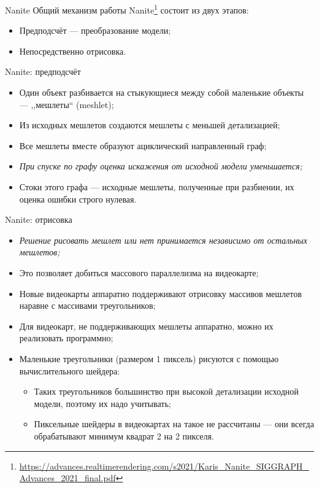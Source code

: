 \documentclass{beamer}
\begin{document}
    \begin{frame}{Nanite}
        Общий механизм работы
        Nanite\footnote{
            \url{https://advances.realtimerendering.com/s2021/Karis_Nanite_SIGGRAPH_Advances_2021_final.pdf}
        } состоит из двух этапов:
        \begin{itemize}
            \item Предподсчёт --- преобразование модели;
            \item Непосредственно отрисовка.
        \end{itemize}
    \end{frame}

    \begin{frame}{Nanite: предподсчёт}
        \begin{itemize}
            \item Один объект разбивается на
            стыкующиеся между собой маленькие объекты
            --- ,,мешлеты`` (meshlet);
            \item Из исходных мешлетов создаются
            мешлеты с меньшей детализацией;
            \item Все мешлеты вместе образуют ациклический
            направленный граф;
            \item \emph{При спуске по графу
            оценка искажения от исходной модели уменьшается;}
            \item Стоки этого графа --- исходные мешлеты,
            полученные при разбиении,
            их оценка ошибки строго нулевая.
        \end{itemize}
    \end{frame}

    \begin{frame}{Nanite: отрисовка}
        \begin{itemize}
            \item \emph{Решение рисовать мешлет или нет
            принимается независимо от остальных мешлетов;}
            \item Это позволяет добиться массового параллелизма
            на видеокарте;
            \item Новые видеокарты аппаратно поддерживают отрисовку
            массивов мешлетов наравне с массивами треугольников;
            \item Для видеокарт, не поддерживающих мешлеты аппаратно,
            можно их реализовать программно;
            \item Маленькие треугольники (размером 1 пиксель)
            рисуются с помощью вычислительного шейдера:
            \begin{itemize}
                \item Таких треугольников большинство
                при высокой детализации исходной модели,
                поэтому их надо учитывать;
                \item Пиксельные шейдеры в видеокартах
                на такое не рассчитаны --- они всегда
                обрабатывают минимум квадрат 2 на 2 пикселя.
            \end{itemize}
        \end{itemize}
    \end{frame}
\end{document}
